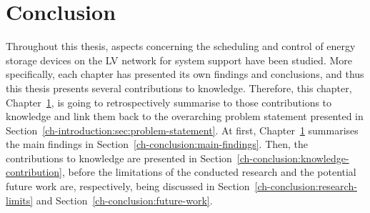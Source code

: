 \chapter{Conclusion}
\label{ch-conclusion}

Throughout this thesis, aspects concerning the scheduling and control of energy storage devices on the LV network for system support have been studied.
More specifically, each chapter has presented its own findings and conclusions, and thus this thesis presents several contributions to knowledge.
Therefore, this chapter, Chapter~\ref{ch-conclusion}, is going to retrospectively summarise to those contributions to knowledge and link them back to the overarching problem statement presented in Section~\ref{ch-introduction:sec:problem-statement}.
At first, Chapter~\ref{ch-conclusion} summarises the main findings in Section~\ref{ch-conclusion:main-findings}.
Then, the contributions to knowledge are presented in Section~\ref{ch-conclusion:knowledge-contribution}, before the limitations of the conducted research and the potential future work are, respectively, being discussed in Section~\ref{ch-conclusion:research-limits} and Section~\ref{ch-conclusion:future-work}.









